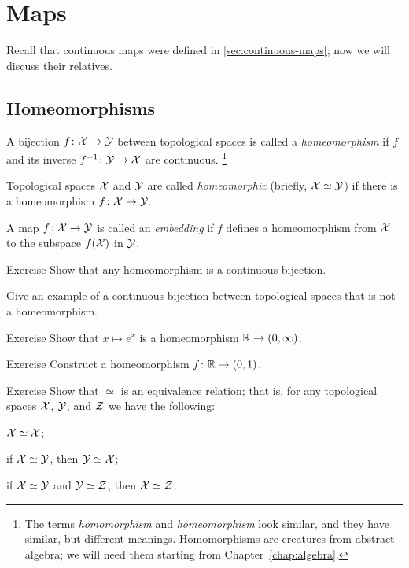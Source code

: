 \chapter{Maps}\label{chap:maps}

Recall that continuous maps were defined in \ref{sec:continuous-maps}; now we will discuss their relatives.

\section{Homeomorphisms}

A bijection $f\colon\mathcal{X}\to\mathcal{Y}$ between topological spaces 
is called a \emph{homeomorphism} if $f$ and its inverse $f^{-1}\colon\mathcal{Y}\to\mathcal{X}$
are continuous.%
\footnote{The terms \textit{homomorphism} and \textit{homeomorphism} look similar, and they have
similar, but different meanings. Homomorphisms are creatures from abstract algebra; we will need them starting from Chapter~\ref{chap:algebra}.}

Topological spaces $\mathcal{X}$ and $\mathcal{Y}$ are called \emph{homeomorphic} (briefly, $\mathcal{X}\simeq\mathcal{Y}$) if there is a homeomorphism $f\colon\mathcal{X}\to\mathcal{Y}$.

A map $f\colon\mathcal{X}\to \mathcal{Y}$ is called an \emph{embedding} if $f$ defines a homeomorphism from $\mathcal{X}$ to the subspace $f(\mathcal{X})$ in $\mathcal{Y}$.

\begin{thm}{Exercise}\label{ex:bijection-ne-homeo}
Show that any homeomorphism is a continuous bijection.

Give an example of a continuous bijection between topological spaces that is not a homeomorphism.
\end{thm}

\begin{thm}{Exercise}\label{ex:exp}
Show that $x\mapsto e^x$ is a homeomorphism $\mathbb{R}\to (0,\infty)$.
\end{thm}

\begin{thm}{Exercise}\label{ex:arctan}
Construct a homeomorphism $f\colon\mathbb{R}\to (0,1)$.
\end{thm}

\begin{thm}{Exercise}\label{ex:homeo=eq}
Show that $\simeq$ is an equivalence relation;
that is, for any topological spaces $\mathcal{X}$, $\mathcal{Y}$, and $\mathcal{Z}$ we have the following:
\begin{subthm}{}
$\mathcal{X}\simeq\mathcal{X}$;
\end{subthm}

\begin{subthm}{}
if $\mathcal{X}\simeq\mathcal{Y}$, then $\mathcal{Y}\simeq\mathcal{X}$;
\end{subthm}

\begin{subthm}{}
if $\mathcal{X}\simeq\mathcal{Y}$ and $\mathcal{Y}\simeq\mathcal{Z}$, then $\mathcal{X}\simeq\mathcal{Z}$.
\end{subthm}

\end{thm}

